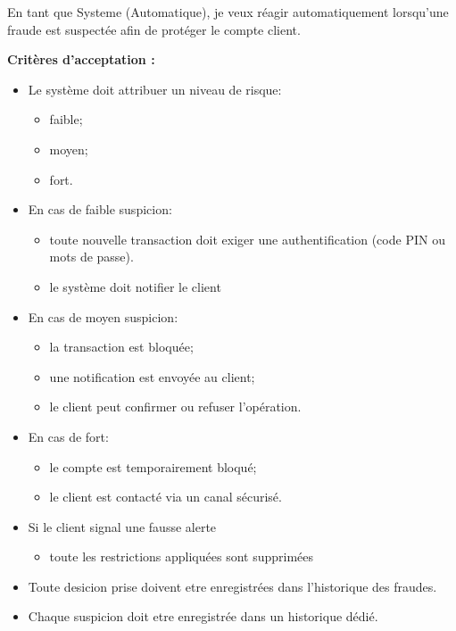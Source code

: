 En tant que Systeme (Automatique), je veux réagir automatiquement
lorsqu'une fraude est suspectée afin de protéger le compte client.

\textbf{Critères d'acceptation :}

\begin{itemize}
\tightlist
\item
  Le système doit attribuer un niveau de risque:

  \begin{itemize}
  \tightlist
  \item
    faible;
  \item
    moyen;
  \item
    fort.
  \end{itemize}
\item
  En cas de faible suspicion:

  \begin{itemize}
  \tightlist
  \item
    toute nouvelle transaction doit exiger une authentification (code
    PIN ou mots de passe).
  \item
    le système doit notifier le client
  \end{itemize}
\item
  En cas de moyen suspicion:

  \begin{itemize}
  \tightlist
  \item
    la transaction est bloquée;
  \item
    une notification est envoyée au client;
  \item
    le client peut confirmer ou refuser l'opération.
  \end{itemize}
\item
  En cas de fort:

  \begin{itemize}
  \tightlist
  \item
    le compte est temporairement bloqué;
  \item
    le client est contacté via un canal sécurisé.
  \end{itemize}
\item
  Si le client signal une fausse alerte

  \begin{itemize}
  \tightlist
  \item
    toute les restrictions appliquées sont supprimées
  \end{itemize}
\item
  Toute desicion prise doivent etre enregistrées dans l'historique des
  fraudes.
\item
  Chaque suspicion doit etre enregistrée dans un historique dédié.
\end{itemize}

